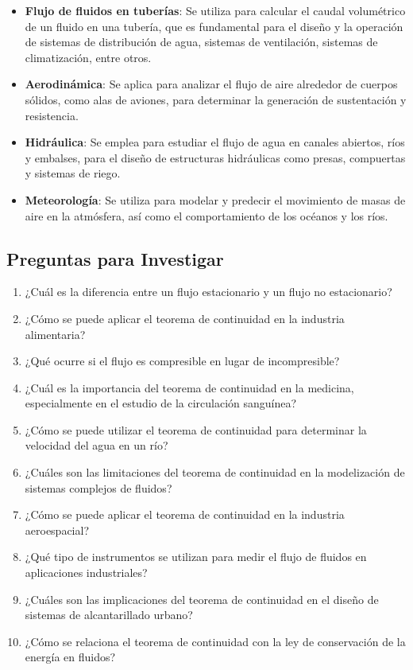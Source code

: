 \documentclass[../main]{subfiles}
\begin{document}
\begin{itemize}
    \item \textbf{Flujo de fluidos en tuberías}: Se utiliza para calcular el caudal volumétrico de un fluido en una tubería, que es fundamental para el diseño y la operación de sistemas de distribución de agua, sistemas de ventilación, sistemas de climatización, entre otros.
    \item \textbf{Aerodinámica}: Se aplica para analizar el flujo de aire alrededor de cuerpos sólidos, como alas de aviones, para determinar la generación de sustentación y resistencia.
    \item \textbf{Hidráulica}: Se emplea para estudiar el flujo de agua en canales abiertos, ríos y embalses, para el diseño de estructuras hidráulicas como presas, compuertas y sistemas de riego.
    \item \textbf{Meteorología}: Se utiliza para modelar y predecir el movimiento de masas de aire en la atmósfera, así como el comportamiento de los océanos y los ríos.
\end{itemize}

\subsection{Preguntas para Investigar}

\begin{enumerate}
    \item ¿Cuál es la diferencia entre un flujo estacionario y un flujo no estacionario?
    \item ¿Cómo se puede aplicar el teorema de continuidad en la industria alimentaria?
    \item ¿Qué ocurre si el flujo es compresible en lugar de incompresible?
    \item ¿Cuál es la importancia del teorema de continuidad en la medicina, especialmente en el estudio de la circulación sanguínea?
    \item ¿Cómo se puede utilizar el teorema de continuidad para determinar la velocidad del agua en un río?
    \item ¿Cuáles son las limitaciones del teorema de continuidad en la modelización de sistemas complejos de fluidos?
    \item ¿Cómo se puede aplicar el teorema de continuidad en la industria aeroespacial?
    \item ¿Qué tipo de instrumentos se utilizan para medir el flujo de fluidos en aplicaciones industriales?
    \item ¿Cuáles son las implicaciones del teorema de continuidad en el diseño de sistemas de alcantarillado urbano?
    \item ¿Cómo se relaciona el teorema de continuidad con la ley de conservación de la energía en fluidos?
\end{enumerate}
\end{document}

